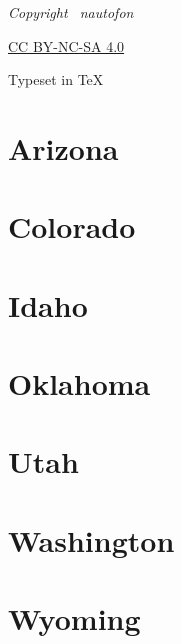 {
\centering \vspace{30mm} \footnotesize \itshape
Copyright \raisebox{.2ex}{\scriptsize\copyright} \the\year\ nautofon \par
\vspace{.4ex}
\href{https://creativecommons.org/licenses/by-nc-sa/4.0/}{CC BY-NC-SA 4.0} \par
\vspace{.4ex}
Typeset in \TeX \par
}
\thispagestyle{empty}

\tableofcontents
\thispagestyle{empty}

\chapter{Arizona}


\chapter{Colorado}


\chapter{Idaho}


\chapter{Oklahoma}


\chapter{Utah}


\chapter{Washington}


\chapter{Wyoming}



